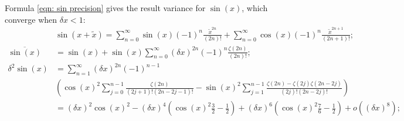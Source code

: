 \documentclass[twoside]{article}
\numberwithin{equation}{section}
\begin{document}
Formula \eqref{eqn: sin precision} gives the result variance for $\sin(x)$, which converge when $\delta x < 1$:
\begin{align}
\label{eqn: sin Taylor}
& \sin(x + \tilde{x}) = \sum_{n=0}^{\infty} \sin(x) (-1)^{n} \frac{\tilde{x}^{2n}}{(2n)!} + \sum_{n=0}^{\infty} \cos(x) (-1)^n \frac{\tilde{x}^{2n+1}}{(2n + 1)!}; \\
\overline{\sin(x)} &= \sin(x) + \sin(x) \sum_{n=0}^{\infty} (\delta x)^{2n} (-1)^{n} \frac{\zeta(2n)}{(2n)!}; \\
\label{eqn: sin precision}
\delta^2 \sin(x) &= \sum_{n=1}^{\infty} (\delta x)^{2n} (-1)^{n - 1} \nonumber \\
 & \left( \cos(x)^2 \sum_{j=0}^{n-1} \frac{\zeta(2n)}{(2j+1)!(2n-2j-1)!}
      - \sin(x)^2 \sum_{j=1}^{n-1} \frac{\zeta(2n) - \zeta(2j) \zeta(2n-2j)}{(2j)!(2n-2j)!} \right) \\ 
 &=  (\delta x)^2 \cos(x)^2 - (\delta x)^4 (\cos(x)^2 \frac{3}{2} - \frac{1}{2}) + (\delta x)^6 (\cos(x)^2 \frac{7}{6} - \frac{1}{2})  + o((\delta x)^8);
\end{align}
\end{document}
